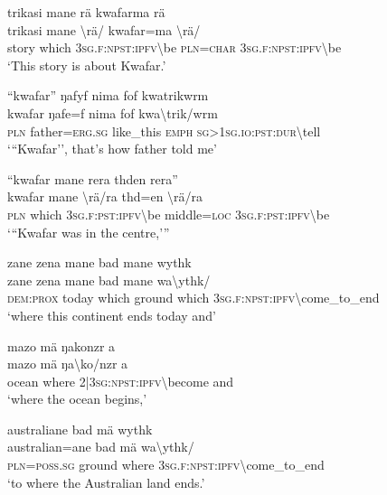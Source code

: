 \ea\label{ex:1:a3486}
trikasi mane rä kwafarma rä\\
\gll trikasi	mane	{\textbackslash}rä/	kwafar=ma	{\textbackslash}rä/\\
     story	which	3\textsc{sg}.\textsc{f}:\textsc{npst}:\textsc{ipfv}{\textbackslash}be	\textsc{pln}=\textsc{char}	3\textsc{sg}.\textsc{f}:\textsc{npst}:\textsc{ipfv}{\textbackslash}be\\
\glt `This story is about Kwafar.'
\z

\ea\label{ex:1:a3489}
``kwafar'' ŋafyf nima fof kwatrikwrm\\
\gll kwafar	ŋafe=f	nima	fof	kwa{\textbackslash}trik/wrm\\
     \textsc{pln}	father=\textsc{erg}.\textsc{sg}	like\_this	\textsc{emph}	\textsc{sg}>1\textsc{sg}.\textsc{io}:\textsc{pst}:\textsc{dur}{\textbackslash}tell\\
\glt `{``}Kwafar'', that's how father told me'
\z

\ea\label{ex:1:a13405}
``kwafar mane rera thden rera''\\
\gll kwafar	mane	{\textbackslash}rä/ra	thd=en	{\textbackslash}rä/ra\\
     \textsc{pln}	which	3\textsc{sg}.\textsc{f}:\textsc{pst}:\textsc{ipfv}{\textbackslash}be	middle=\textsc{loc}	3\textsc{sg}.\textsc{f}:\textsc{pst}:\textsc{ipfv}{\textbackslash}be\\
\glt `{``}Kwafar was in the centre,'''
\z

\ea\label{ex:1:a3491}
zane zena mane bad mane wythk\\
\gll zane	zena	mane	bad	mane	wa{\textbackslash}ythk/\\
     \textsc{dem}:\textsc{prox}	today	which	ground	which	3\textsc{sg}.\textsc{f}:\textsc{npst}:\textsc{ipfv}{\textbackslash}come\_to\_end\\
\glt `where this continent ends today and'
\z

\ea\label{ex:1:a3492}
mazo mä ŋakonzr a\\
\gll mazo	mä	ŋa{\textbackslash}ko/nzr	a\\
     ocean	where	2|3\textsc{sg}:\textsc{npst}:\textsc{ipfv}{\textbackslash}become	and\\
\glt `where the ocean begins,'
\z

\ea\label{ex:1:a3494}
australiane bad mä wythk\\
\gll australian=ane	bad	mä	wa{\textbackslash}ythk/\\
     \textsc{pln}=\textsc{poss}.\textsc{sg}	ground	where	3\textsc{sg}.\textsc{f}:\textsc{npst}:\textsc{ipfv}{\textbackslash}come\_to\_end\\
\glt `to where the Australian land ends.'
\z


